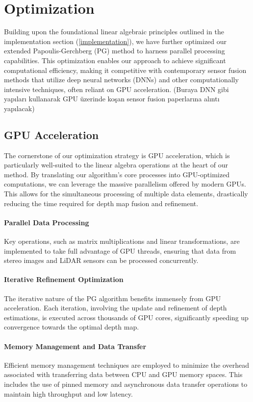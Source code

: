 \documentclass[conference]{IEEEtran}
\begin{document}
\section{Optimization}

Building upon the foundational linear algebraic principles outlined in the implementation section (\ref{implementation}), we have further optimized our extended Papoulis-Gerchberg (PG) method to harness parallel processing capabilities. This optimization enables our approach to achieve significant computational efficiency, making it competitive with contemporary sensor fusion methods that utilize deep neural networks (DNNs) and other computationally intensive techniques, often reliant on GPU acceleration.
(Buraya DNN gibi yapıları kullanarak GPU üzerinde koşan sensor fusion paperlarına alıntı yapılacak)

\subsection{GPU Acceleration}

The cornerstone of our optimization strategy is GPU acceleration, which is particularly well-suited to the linear algebra operations at the heart of our method. By translating our algorithm's core processes into GPU-optimized computations, we can leverage the massive parallelism offered by modern GPUs. This allows for the simultaneous processing of multiple data elements, drastically reducing the time required for depth map fusion and refinement.

\paragraph{Parallel Data Processing} Key operations, such as matrix multiplications and linear transformations, are implemented to take full advantage of GPU threads, ensuring that data from stereo images and LiDAR sensors can be processed concurrently.

\paragraph{Iterative Refinement Optimization} The iterative nature of the PG algorithm benefits immensely from GPU acceleration. Each iteration, involving the update and refinement of depth estimations, is executed across thousands of GPU cores, significantly speeding up convergence towards the optimal depth map.

\paragraph{Memory Management and Data Transfer} Efficient memory management techniques are employed to minimize the overhead associated with transferring data between CPU and GPU memory spaces. This includes the use of pinned memory and asynchronous data transfer operations to maintain high throughput and low latency.
\end{document}
